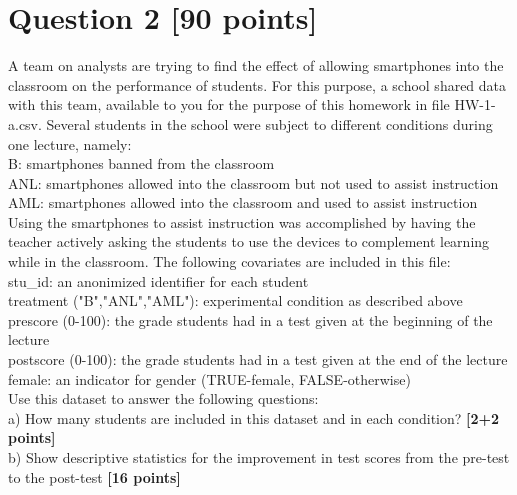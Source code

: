 \documentclass{article}
\begin{document}
\section*{\color{black} Question 2 {\bf [90 points]}}

A team on analysts are trying to find the effect of allowing smartphones into the classroom on the performance of students. For this purpose, a school shared data with this team, available to you for the purpose of this homework in file HW-1-a.csv. Several students in the school were subject to different conditions during one lecture, namely:\\

B: smartphones banned from the classroom\\

ANL: smartphones allowed into the classroom but not used to assist instruction\\

AML: smartphones allowed into the classroom and used to assist instruction\\

Using the smartphones to assist instruction was accomplished by having the teacher actively asking the students to use the devices to complement learning while in the classroom. The following covariates are included in this file:\\

stu\_id: an anonimized identifier for each student\\

treatment ("B","ANL","AML"): experimental condition as described above\\

prescore (0-100): the grade students had in a test given at the beginning of the lecture\\

postscore (0-100): the grade students had in a test given at the end of the lecture\\

female: an indicator for gender (TRUE-female, FALSE-otherwise)\\

Use this dataset to answer the following questions:\\

a) How many students are included in this dataset and in each condition? {\bf [2+2 points]}\\

b) Show descriptive statistics for the improvement in test scores from the pre-test to the post-test {\bf [16 points]}\\
\end{document}
